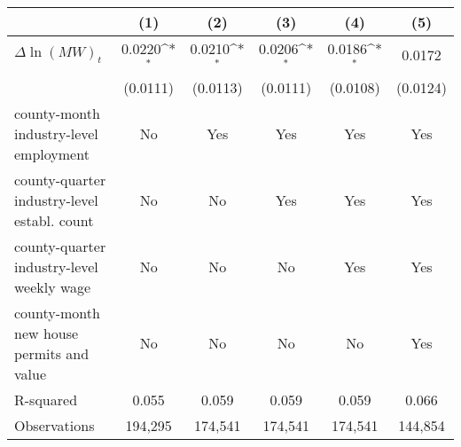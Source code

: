 {
\def\sym#1{\ifmmode^{#1}\else\(^{#1}\)\fi}
\begin{tabular}{l*{5}{c}}
\hline\hline
          &\multicolumn{1}{c}{(1)}         &\multicolumn{1}{c}{(2)}         &\multicolumn{1}{c}{(3)}         &\multicolumn{1}{c}{(4)}         &\multicolumn{1}{c}{(5)}         \\
\hline
$\Delta \ln(MW)_{t}$&   0.0220\sym{*}  &   0.0210\sym{*}  &   0.0206\sym{*}  &   0.0186\sym{*}  &   0.0172         \\
          & (0.0111)         & (0.0113)         & (0.0111)         & (0.0108)         & (0.0124)         \\
\hline
county-month industry-level employment&       No         &      Yes         &      Yes         &      Yes         &      Yes         \\
county-quarter industry-level establ. count&       No         &       No         &      Yes         &      Yes         &      Yes         \\
county-quarter industry-level weekly wage&       No         &       No         &       No         &      Yes         &      Yes         \\
county-month new house permits and value&       No         &       No         &       No         &       No         &      Yes         \\
R-squared &    0.055         &    0.059         &    0.059         &    0.059         &    0.066         \\
Observations&  194,295         &  174,541         &  174,541         &  174,541         &  144,854         \\
\hline\hline
\end{tabular}
}

